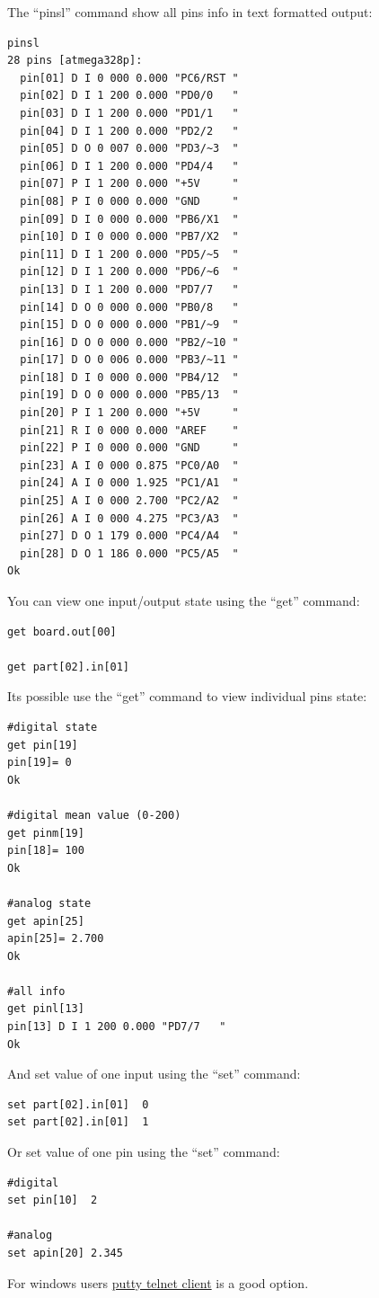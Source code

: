 The ``pinsl'' command show all pins info in text formatted output:
\begin{verbatim}
pinsl
28 pins [atmega328p]:
  pin[01] D I 0 000 0.000 "PC6/RST " 
  pin[02] D I 1 200 0.000 "PD0/0   " 
  pin[03] D I 1 200 0.000 "PD1/1   " 
  pin[04] D I 1 200 0.000 "PD2/2   " 
  pin[05] D O 0 007 0.000 "PD3/~3  " 
  pin[06] D I 1 200 0.000 "PD4/4   " 
  pin[07] P I 1 200 0.000 "+5V     " 
  pin[08] P I 0 000 0.000 "GND     " 
  pin[09] D I 0 000 0.000 "PB6/X1  " 
  pin[10] D I 0 000 0.000 "PB7/X2  " 
  pin[11] D I 1 200 0.000 "PD5/~5  " 
  pin[12] D I 1 200 0.000 "PD6/~6  " 
  pin[13] D I 1 200 0.000 "PD7/7   " 
  pin[14] D O 0 000 0.000 "PB0/8   " 
  pin[15] D O 0 000 0.000 "PB1/~9  " 
  pin[16] D O 0 000 0.000 "PB2/~10 " 
  pin[17] D O 0 006 0.000 "PB3/~11 " 
  pin[18] D I 0 000 0.000 "PB4/12  " 
  pin[19] D O 0 000 0.000 "PB5/13  " 
  pin[20] P I 1 200 0.000 "+5V     " 
  pin[21] R I 0 000 0.000 "AREF    " 
  pin[22] P I 0 000 0.000 "GND     " 
  pin[23] A I 0 000 0.875 "PC0/A0  " 
  pin[24] A I 0 000 1.925 "PC1/A1  " 
  pin[25] A I 0 000 2.700 "PC2/A2  " 
  pin[26] A I 0 000 4.275 "PC3/A3  " 
  pin[27] D O 1 179 0.000 "PC4/A4  " 
  pin[28] D O 1 186 0.000 "PC5/A5  " 
Ok
\end{verbatim}


You can view one input/output state using the ``get'' command:
\begin{verbatim}
get board.out[00]

get part[02].in[01]
\end{verbatim}

Its possible use the ``get'' command to view individual pins state:
\begin{verbatim}
#digital state
get pin[19]
pin[19]= 0 
Ok

#digital mean value (0-200)
get pinm[19]
pin[18]= 100 
Ok

#analog state
get apin[25]
apin[25]= 2.700
Ok

#all info
get pinl[13]
pin[13] D I 1 200 0.000 "PD7/7   "
Ok
\end{verbatim}



And set value of one input using the ``set'' command:
\begin{verbatim}
set part[02].in[01]  0
set part[02].in[01]  1
\end{verbatim}

Or set value of one pin using the ``set'' command:
\begin{verbatim}
#digital
set pin[10]  2

#analog
set apin[20] 2.345
\end{verbatim}





For windows users \href{https://www.putty.org/}{putty telnet client} is a good option. 
